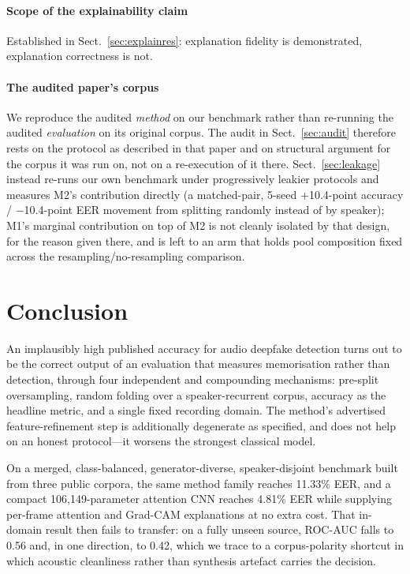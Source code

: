 \documentclass[sn-mathphys-num,pdflatex]{sn-jnl}
\begin{document}
\paragraph{Scope of the explainability claim}
Established in Sect.~\ref{sec:explainres}: explanation fidelity is demonstrated,
explanation correctness is not.

\paragraph{The audited paper's corpus}
We reproduce the audited \emph{method} on our benchmark rather than re-running
the audited \emph{evaluation} on its original corpus. The audit in
Sect.~\ref{sec:audit} therefore rests on the protocol as described in that
paper and on structural argument for the corpus it was run on, not on a
re-execution of it there. Sect.~\ref{sec:leakage} instead re-runs our own
benchmark under progressively leakier protocols and measures M2's contribution
directly (a matched-pair, 5-seed +10.4-point accuracy / $-$10.4-point EER
movement from splitting randomly instead of by speaker); M1's marginal
contribution on top of M2 is not cleanly isolated by that design, for the
reason given there, and is left to an arm that holds pool composition fixed
across the resampling/no-resampling comparison.

\section{Conclusion}\label{sec:conclusion}

An implausibly high published accuracy for audio deepfake detection turns out to
be the correct output of an evaluation that measures memorisation rather than
detection, through four independent and compounding mechanisms: pre-split
oversampling, random folding over a speaker-recurrent corpus, accuracy as the
headline metric, and a single fixed recording domain. The method's advertised
feature-refinement step is additionally degenerate as specified, and does not
help on an honest protocol---it worsens the strongest classical model.

On a merged, class-balanced, generator-diverse, speaker-disjoint benchmark built
from three public corpora, the same method family reaches 11.33\% EER, and a
compact 106{,}149-parameter attention CNN reaches 4.81\% EER while supplying
per-frame attention and Grad-CAM explanations at no extra cost. That in-domain
result then fails to transfer: on a fully unseen source, ROC-AUC falls to 0.56
and, in one direction, to 0.42, which we trace to a corpus-polarity shortcut in
which acoustic cleanliness rather than synthesis artefact carries the decision.
\end{document}
